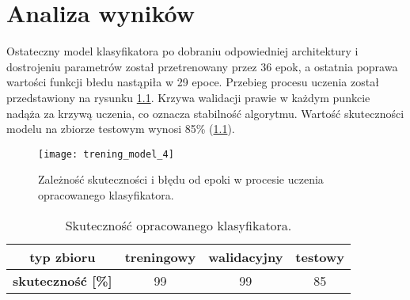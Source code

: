 \chapter{Analiza wyników}
\label{cha:analiza_wynikow}

Ostateczny model klasyfikatora po dobraniu odpowiedniej architektury i dostrojeniu parametrów został przetrenowany przez 36 epok, a ostatnia poprawa wartości funkcji błedu nastąpiła w 29 epoce. Przebieg procesu uczenia został przedstawiony na rysunku \ref{fig:trening_model_4}. Krzywa walidacji prawie w każdym punkcie nadąża za krzywą uczenia, co oznacza stabilność algorytmu. Wartość skuteczności modelu na zbiorze testowym wynosi 85\% (\ref{tab:acc}).

\begin{figure}[h!]
	\centering
	\centering
		\texttt{[image: trening\_model\_4]}	
	\caption{Zależność skuteczności i błędu od epoki w procesie uczenia opracowanego klasyfikatora.}\label{fig:trening_model_4}
\end{figure}

\begin{table}[h!]
\centering
\caption[Short Heading]{Skuteczność opracowanego klasyfikatora.}
\label{tab:acc}
\begin{tabular}{|c|c|c|c|}
\hline
\textbf{typ zbioru}           & \textbf{treningowy} & \textbf{walidacyjny} & \textbf{testowy} \\ \hline
\textbf{skuteczność {[}\%{]}} & 99                  & 99                   & 85               \\ \hline
\end{tabular}
\end{table}

